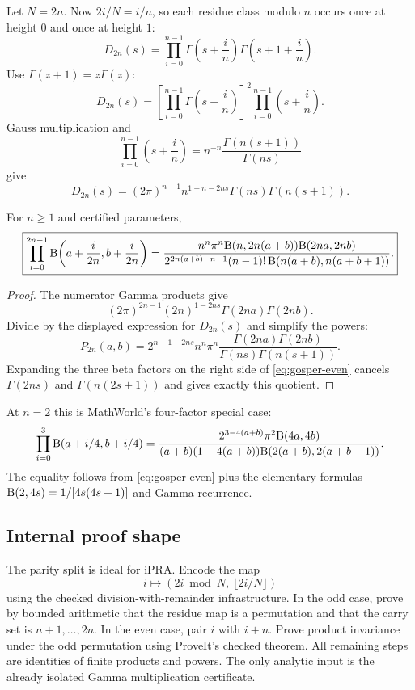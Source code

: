 Let $N=2n$.  Now $2i/N=i/n$, so each residue class modulo $n$ occurs once at height $0$ and once at height $1$:
\[
 D_{2n}(s)
 =\prod_{i=0}^{n-1}
   \Gamma\!\left(s+\frac in\right)
   \Gamma\!\left(s+1+\frac in\right).
\]
Use $\Gamma(z+1)=z\Gamma(z)$:
\[
 D_{2n}(s)
 =\left[\prod_{i=0}^{n-1}
   \Gamma\!\left(s+\frac in\right)\right]^2
   \prod_{i=0}^{n-1}\left(s+\frac in\right).
\]
Gauss multiplication and
\[
 \prod_{i=0}^{n-1}\left(s+\frac in\right)
 =n^{-n}\frac{\Gamma(n(s+1))}{\Gamma(ns)}
\]
give
\[
 D_{2n}(s)
 =(2\pi)^{n-1}n^{1-n-2ns}
 \Gamma(ns)\Gamma(n(s+1)).
\]

\begin{theorem}\label{thm:gosper-even}
For $n\ge1$ and certified parameters,
\begin{equation}
 \boxed{
 \prod_{i=0}^{2n-1}
 \mathrm B\!\left(a+\frac{i}{2n},b+\frac{i}{2n}\right)
 =
 \frac{n^n\pi^n\mathrm B(n,2n(a+b))\mathrm B(2na,2nb)}
 {2^{2n(a+b)-n-1}(n-1)!\,
  \mathrm B(n(a+b),n(a+b+1))}.}
 \label{eq:gosper-even}
\end{equation}
\end{theorem}

\begin{proof}
The numerator Gamma products give
\[
 (2\pi)^{2n-1}(2n)^{1-2ns}
 \Gamma(2na)\Gamma(2nb).
\]
Divide by the displayed expression for $D_{2n}(s)$ and simplify the powers:
\[
 P_{2n}(a,b)=
 2^{n+1-2ns}n^n\pi^n
 \frac{\Gamma(2na)\Gamma(2nb)}
 {\Gamma(ns)\Gamma(n(s+1))}.
\]
Expanding the three beta factors on the right side of
\eqref{eq:gosper-even} cancels
$\Gamma(2ns)$ and $\Gamma(n(2s+1))$ and gives exactly this quotient.
\end{proof}

At $n=2$ this is MathWorld's four-factor special case:
\[
 \prod_{i=0}^{3}\mathrm B(a+i/4,b+i/4)
 =
 \frac{2^{3-4(a+b)}\pi^2\mathrm B(4a,4b)}
 {(a+b)(1+4(a+b))
   \mathrm B(2(a+b),2(a+b+1))}.
\]
The equality follows from \eqref{eq:gosper-even} plus the elementary formulas
$\mathrm B(2,4s)=1/[4s(4s+1)]$ and Gamma recurrence.

\subsection{Internal proof shape}

The parity split is ideal for iPRA.  Encode the map
\[
 i\longmapsto (2i\bmod N,\ \lfloor2i/N\rfloor)
\]
using the checked division-with-remainder infrastructure.  In the odd case, prove by bounded arithmetic that the residue map is a permutation and that the carry set is $n+1,\dots,2n$.  In the even case, pair $i$ with $i+n$.  Prove product invariance under the odd permutation using ProveIt's checked  theorem.  All remaining steps are identities of finite products and powers.  The only analytic input is the already isolated Gamma multiplication certificate.
